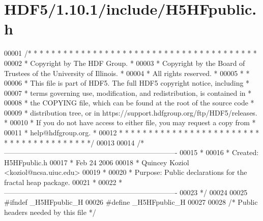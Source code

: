 \hypertarget{_h_d_f5_21_810_81_2include_2_h5_h_fpublic_8h_source}{}\section{H\+D\+F5/1.10.1/include/\+H5\+H\+Fpublic.h}
\label{_h_d_f5_21_810_81_2include_2_h5_h_fpublic_8h_source}

\begin{DoxyCode}
00001 \textcolor{comment}{/* * * * * * * * * * * * * * * * * * * * * * * * * * * * * * * * * * * * * * *}
00002 \textcolor{comment}{ * Copyright by The HDF Group.                                               *}
00003 \textcolor{comment}{ * Copyright by the Board of Trustees of the University of Illinois.         *}
00004 \textcolor{comment}{ * All rights reserved.                                                      *}
00005 \textcolor{comment}{ *                                                                           *}
00006 \textcolor{comment}{ * This file is part of HDF5.  The full HDF5 copyright notice, including     *}
00007 \textcolor{comment}{ * terms governing use, modification, and redistribution, is contained in    *}
00008 \textcolor{comment}{ * the COPYING file, which can be found at the root of the source code       *}
00009 \textcolor{comment}{ * distribution tree, or in https://support.hdfgroup.org/ftp/HDF5/releases.  *}
00010 \textcolor{comment}{ * If you do not have access to either file, you may request a copy from     *}
00011 \textcolor{comment}{ * help@hdfgroup.org.                                                        *}
00012 \textcolor{comment}{ * * * * * * * * * * * * * * * * * * * * * * * * * * * * * * * * * * * * * * */}
00013 
00014 \textcolor{comment}{/*-------------------------------------------------------------------------}
00015 \textcolor{comment}{ *}
00016 \textcolor{comment}{ * Created:             H5HFpublic.h}
00017 \textcolor{comment}{ *                      Feb 24 2006}
00018 \textcolor{comment}{ *                      Quincey Koziol <koziol@ncsa.uiuc.edu>}
00019 \textcolor{comment}{ *}
00020 \textcolor{comment}{ * Purpose:             Public declarations for the fractal heap package.}
00021 \textcolor{comment}{ *}
00022 \textcolor{comment}{ *-------------------------------------------------------------------------}
00023 \textcolor{comment}{ */}
00024 
00025 \textcolor{preprocessor}{#ifndef \_H5HFpublic\_H}
00026 \textcolor{preprocessor}{#define \_H5HFpublic\_H}
00027 
00028 \textcolor{comment}{/* Public headers needed by this file */}

\end{DoxyCode}
